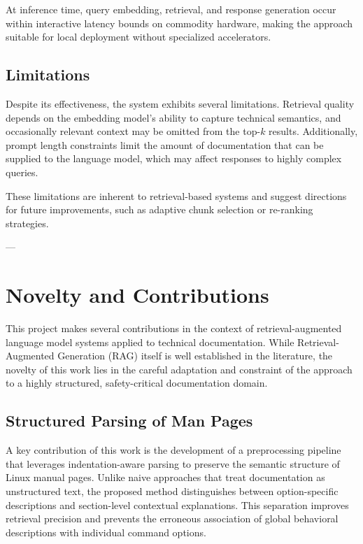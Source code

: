 \documentclass[conference]{IEEEtran}
\begin{document}
At inference time, query embedding, retrieval, and response generation occur within interactive latency bounds on commodity hardware, making the approach suitable for local deployment without specialized accelerators.

\subsection{Limitations}

Despite its effectiveness, the system exhibits several limitations. Retrieval quality depends on the embedding model’s ability to capture technical semantics, and occasionally relevant context may be omitted from the top-$k$ results. Additionally, prompt length constraints limit the amount of documentation that can be supplied to the language model, which may affect responses to highly complex queries.

These limitations are inherent to retrieval-based systems and suggest directions for future improvements, such as adaptive chunk selection or re-ranking strategies.

---

\section{Novelty and Contributions}

This project makes several contributions in the context of retrieval-augmented language model systems applied to technical documentation. While Retrieval-Augmented Generation (RAG) itself is well established in the literature, the novelty of this work lies in the careful adaptation and constraint of the approach to a highly structured, safety-critical documentation domain.

\subsection{Structured Parsing of Man Pages}

A key contribution of this work is the development of a preprocessing pipeline that leverages indentation-aware parsing to preserve the semantic structure of Linux manual pages. Unlike naive approaches that treat documentation as unstructured text, the proposed method distinguishes between option-specific descriptions and section-level contextual explanations. This separation improves retrieval precision and prevents the erroneous association of global behavioral descriptions with individual command options.
\end{document}
